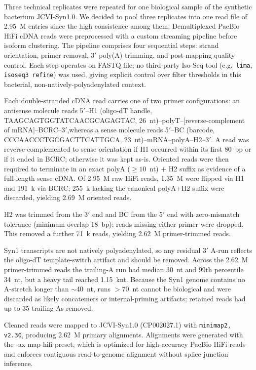 Three technical replicates were repeated for one biological sample of the synthetic bacterium JCVI-Syn1.0. We decided to pool three replicates into one read file of 2.95~M entries since the high consistence among them. Demultiplexed PacBio HiFi cDNA reads were preprocessed with a custom
streaming pipeline before isoform clustering. The pipeline comprises four sequential steps: strand orientation, primer removal, 3$'$ poly(A) trimming, and post-mapping quality control. Each step operates on FASTQ file; no third-party Iso-Seq tool (e.g.\ \texttt{lima}, \texttt{isoseq3 refine}) was used, giving explicit control over filter thresholds in this bacterial, non-natively-polyadenylated context.

Each double-stranded cDNA read carries one of two primer configurations: an antisense molecule reads 5$'$--H1 (oligo-dT handle, TAAGCAGTGGTATCAACGCAGAGTAC, 26~nt)--polyT--[reverse-complement of mRNA]--BCRC--3$'$,whereas a sense molecule reads 5$'$--BC (barcode, CCCAACCCTGCGACTTCATTGCA, 23~nt)--mRNA--polyA--H2--3$'$. A read was reverse-complemented to sense orientation if H1 occurred within its first 80~bp or if it ended in BCRC; otherwise it was kept as-is. Oriented reads were then required to terminate in an exact polyA ($\geq 10$~nt) $+$ H2 suffix as evidence of a full-length sense cDNA. Of 2.95~M raw HiFi reads, 1.35~M were flipped via H1 and 191~k via BCRC; 255~k lacking the canonical polyA$+$H2 suffix were discarded, yielding 2.69~M oriented reads.

H2 was trimmed from the 3$'$ end and BC from the 5$'$ end with zero-mismatch tolerance (minimum overlap 18~bp); reads missing either primer were dropped. This removed a further 71~k reads, yielding 2.62~M primer-trimmed reads.

Syn1 transcripts are not natively polyadenylated, so any residual 3$'$ A-run reflects the oligo-dT template-switch artifact and should be removed. Across the 2.62~M primer-trimmed reads the trailing-A run had median 30~nt and 99th percentile 34~nt, but a heavy tail reached 1.15~knt. Because the Syn1 genome contains no A-stretch longer than $\sim$40~nt, runs $>70$~nt cannot be biological and were discarded as likely concatemers or internal-priming artifacts; retained reads had up to 35 trailing As removed.

Cleaned reads were mapped to JCVI-Syn1.0 (CP002027.1) with \texttt{minimap2, v2.30}, producing 2.62~M primary alignments. Alignments were generated with the -ax map-hifi preset, which is optimized for high-accuracy PacBio HiFi reads and enforces contiguous read-to-genome alignment without splice junction inference.

